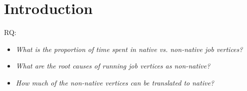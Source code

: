 \section{Introduction}

RQ:
\begin{itemize}
\item \emph{What is the proportion of time spent in native vs. non-native job vertices?}
\item \emph{What are the root causes of running job vertices as non-native?}
\item \emph{How much of the non-native vertices can be translated to native?}
\end{itemize}